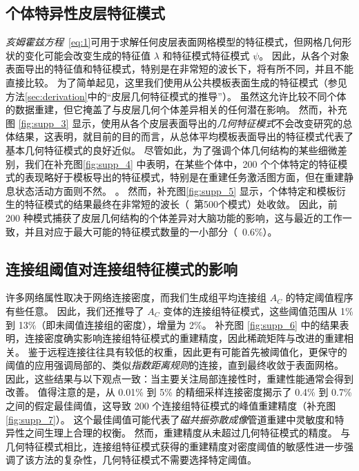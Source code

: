 \documentclass[lang=cn,a4paper,newtx,citestyle=gb7714-2015, bibstyle=gb7714-2015]{elegantpaper}
\begin{document}
\subsection{个体特异性皮层特征模式} \label{sec:individual_specific}
\textit{亥姆霍兹方程}~\ref{eq:1}可用于求解任何皮层表面网格模型的特征模式，但网格几何形状的变化可能会改变生成的特征值 $ \lambda $ 和特征模式特征模式 $ \psi $。
因此，从各个对象表面导出的特征值和特征模式，特别是在非常短的波长下，将有所不同，并且不能直接比较\cite{henderson2022empirical,chen2022individuality}。
为了简单起见，这里我们使用从公共模板表面生成的特征模式（参见方法\ref{sec:derivation}中的“皮层几何特征模式的推导”）。
虽然这允许比较不同个体的数据重建，但它掩盖了与皮层几何个体差异相关的任何潜在影响。
然而，补充图 \ref{fig:supp_3} 显示，使用从各个皮层表面导出的\textit{几何特征模式}不会改变研究的总体结果，这表明，就目前的目的而言，从总体平均模板表面导出的特征模式代表了基本几何特征模式的良好近似。
尽管如此，为了强调个体几何结构的某些细微差别，我们在补充图\ref{fig:supp_4} 中表明，在某些个体中，200 个个体特定的特征模式的表现略好于模板导出的特征模式，特别是在重建任务激活图方面，但在重建静息状态活动方面则不然。 。 
然而，补充图\ref{fig:supp_5} 显示，个体特定和模板衍生的特征模式的结果最终在非常短的波长（~第500个模式）处收敛。
因此，前 200 种模式捕获了皮层几何结构的个体差异对大脑功能的影响，这与最近的工作\cite{chen2022individuality}一致，并且对应于最大可能的特征模式数量的一小部分（~0.6\%）。


\subsection{连接组阈值对连接组特征模式的影响} \label{sec:thresholding_effect}

许多网络属性取决于网络连接密度，而我们生成组平均连接组 $ A_C $ 的特定阈值程序有些任意。
因此，我们还推导了 $ A_C $ 变体的连接组特征模式，这些阈值范围从 1\% 到 13\%（即未阈值连接组的密度），增量为 2\%。
补充图 \ref{fig:supp_6} 中的结果表明，连接密度确实影响连接组特征模式的重建精度，因此稀疏矩阵与改进的重建相关。
鉴于远程连接往往具有较低的权重，因此更有可能首先被阈值化，更保守的阈值的应用强调局部的、类似\textit{指数距离规则}的连接，直到最终收敛于表面网格。
因此，这些结果与以下观点一致：当主要关注局部连接性时，重建性能通常会得到改善。
值得注意的是，从 0.01\% 到 5\% 的精细采样连接密度揭示了 0.4\% 到 0.7\% 之间的假定最佳阈值，这导致 200 个连接组特征模式的峰值重建精度（补充图 \ref{fig:supp_7}）。
这个最佳阈值可能代表了\textit{磁共振弥散成像}管道重建中灵敏度和特异性之间生理上合理的权衡。
然而，重建精度从未超过几何特征模式的精度。
与几何特征模式相比，连接组特征模式获得的重建精度对密度阈值的敏感性进一步强调了该方法的复杂性，几何特征模式不需要选择特定阈值。
\end{document}

